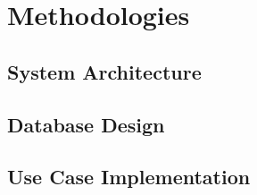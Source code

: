 \documentclass{article}
\makeatletter
\newcommand\subsubsubsection{\@startsection{paragraph}{4}{\z@}{-2.5ex\@plus -1ex \@minus -.25ex}{1.25ex \@plus .25ex}{\normalfont\normalsize\bfseries}}
\makeatother
\begin{document}








\section{Methodologies}
\subsection{System Architecture}
\subsection{Database Design}
\subsection{Use Case Implementation}



\end{document}
